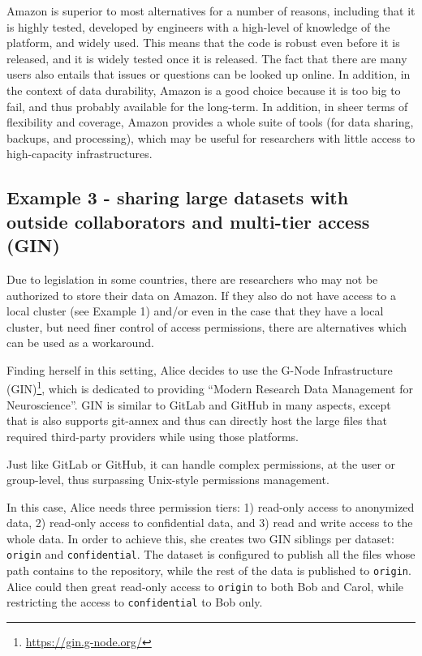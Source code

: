 \documentclass[smallextended]{svjour3}       %
\begin{document}
Amazon is superior to most alternatives for a number of reasons, including that it is highly tested, developed by engineers with a high-level of knowledge of the platform, and widely used. This means that the code is robust even before it is released, and it is widely tested once it is released. The fact that there are many users also entails that issues or questions can be looked up online. In addition, in the context of data durability, Amazon is a good choice because it is too big to fail, and thus probably available for the long-term. In addition, in sheer terms of flexibility and coverage, Amazon provides a whole suite of tools (for data sharing, backups, and processing), which may be useful for researchers with little access to high-capacity infrastructures.

\subsection{Example 3 - sharing large datasets with outside collaborators  and multi-tier access (GIN)}\label{appendix:gin}

Due to legislation in some countries, there are researchers who may not be authorized to store their data on Amazon. If they also do not have access to a local cluster (see Example 1) and/or even in the case that they have a local cluster, but need finer control of access permissions, there are alternatives which can be used as a workaround.

Finding herself in this setting, Alice decides to use the G-Node Infrastructure (GIN)\footnote{\url{https://gin.g-node.org/}}, which is dedicated to providing ``Modern Research Data Management for Neuroscience''. GIN is similar to GitLab and GitHub in many aspects, except that is also supports git-annex and thus can directly host the large files that required third-party providers while using those platforms.

Just like GitLab or GitHub, it can handle complex permissions, at the user or group-level, thus surpassing Unix-style permissions management.

In this case, Alice needs three permission tiers: 1) read-only access to anonymized data, 2) read-only access to confidential data, and 3) read and write access to the whole data. In order to achieve this, she creates two GIN siblings per dataset: \texttt{origin} and \texttt{confidential}. The dataset is configured to publish all the files whose path contains  to the  repository, while the rest of the data is published to \texttt{origin}. Alice could then great read-only access to \texttt{origin} to both Bob and Carol, while restricting the access to \texttt{confidential} to Bob only.
\end{document}

